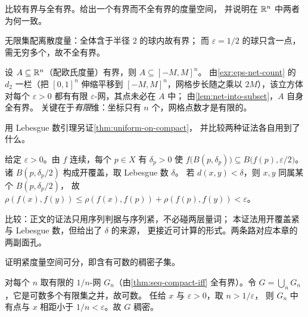 \begin{exercise}[结构]
  \label{exr:bounded-vs-tb}
  比较有界与全有界。给出一个有界而不全有界的度量空间，
  并说明在 \(\mathbb{R}^{n}\) 中两者为何一致。
  \begin{solution}
    无限集配离散度量：全体含于半径 \(2\) 的球内故有界；
    而 \(\varepsilon=1/2\) 的球只含一点，需无穷多个，故不全有界。

    设 \(A \subseteq \mathbb{R}^{n}\)（配欧氏度量）有界，则 \(A \subseteq [-M,M]^{n}\)。
    由\cref{exr:eps-net-count} 的 \(d_{2}\) 一栏（把 \([0,1]^{n}\) 伸缩平移到
    \([-M,M]^{n}\)，网格步长随之乘以 \(2M\)），该立方体对每个 \(\varepsilon>0\)
    都有有限 \(\varepsilon\)-网，其点未必在 \(A\) 中；
    由\cref{lem:net-into-subset}，\(A\) 自身全有界。
    关键在于\emph{有限}维：坐标只有 \(n\) 个，网格点数才是有限的。
  \end{solution}
\end{exercise}

\begin{exercise}[结构]
  \label{exr:lebesgue-alt}
  用 Lebesgue 数引理另证\cref{thm:uniform-on-compact}，
  并比较两种证法各自用到了什么。
  \begin{solution}
    给定 \(\varepsilon>0\)。由 \(f\) 连续，每个 \(p \in X\) 有 \(\delta_{p}>0\) 使
    \(f\bigl(B(p,\delta_{p})\bigr) \subseteq B\bigl(f(p),\varepsilon/2\bigr)\)。
    诸 \(B(p,\delta_{p}/2)\) 构成开覆盖，取 Lebesgue 数 \(\delta\)。
    若 \(d(x,y)<\delta\)，则 \(x,y\) 同属某个 \(B(p,\delta_{p}/2)\)，
    故 \(\rho(f(x),f(y)) \le \rho(f(x),f(p)) + \rho(f(p),f(y)) < \varepsilon\)。

    比较：正文的证法只用序列判据与序列紧，不必碰两层量词；
    本证法用开覆盖紧与 Lebesgue 数，但给出了 \(\delta\) 的来源，
    更接近可计算的形式。两条路对应本章的两副面孔。
  \end{solution}
\end{exercise}

\begin{exercise}[结构]
  \label{exr:compact-separable}
  证明紧度量空间可分，即含有可数的稠密子集。
  \begin{solution}
    对每个 \(n\) 取有限的 \(1/n\)-网 \(G_{n}\)（由\cref{thm:seq-compact-iff}
    全有界）。令 \(G = \bigcup_{n} G_{n}\)，它是可数多个有限集之并，故可数。
    任给 \(x\) 与 \(\varepsilon>0\)，取 \(n > 1/\varepsilon\)，
    则 \(G_{n}\) 中有点与 \(x\) 相距小于 \(1/n < \varepsilon\)。故 \(G\) 稠密。
  \end{solution}
\end{exercise}


